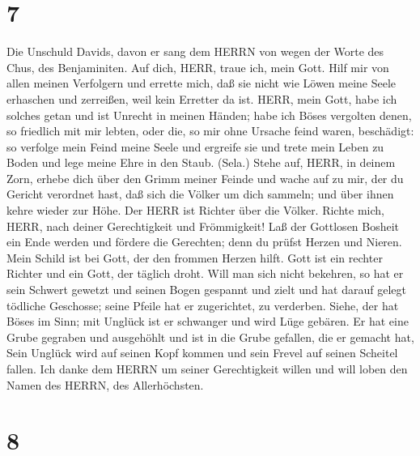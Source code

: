 \hypertarget{section-6}{%
\section{7}\label{section-6}}

 Die Unschuld Davids, davon er sang dem HERRN von wegen der
Worte des Chus, des Benjaminiten. Auf dich, HERR, traue ich, mein Gott.
Hilf mir von allen meinen Verfolgern und errette mich,  daß
sie nicht wie Löwen meine Seele erhaschen und zerreißen, weil kein
Erretter da ist.  HERR, mein Gott, habe ich solches getan
und ist Unrecht in meinen Händen;  habe ich Böses vergolten
denen, so friedlich mit mir lebten, oder die, so mir ohne Ursache feind
waren, beschädigt:  so verfolge mein Feind meine Seele und
ergreife sie und trete mein Leben zu Boden und lege meine Ehre in den
Staub. (Sela.)  Stehe auf, HERR, in deinem Zorn, erhebe dich
über den Grimm meiner Feinde und wache auf zu mir, der du Gericht
verordnet hast,  daß sich die Völker um dich sammeln; und
über ihnen kehre wieder zur Höhe.  Der HERR ist Richter über
die Völker. Richte mich, HERR, nach deiner Gerechtigkeit und
Frömmigkeit!  Laß der Gottlosen Bosheit ein Ende werden und
fördere die Gerechten; denn du prüfst Herzen und Nieren. 
Mein Schild ist bei Gott, der den frommen Herzen hilft. 
Gott ist ein rechter Richter und ein Gott, der täglich droht.
 Will man sich nicht bekehren, so hat er sein Schwert
gewetzt und seinen Bogen gespannt und zielt  und hat darauf
gelegt tödliche Geschosse; seine Pfeile hat er zugerichtet, zu
verderben.  Siehe, der hat Böses im Sinn; mit Unglück ist
er schwanger und wird Lüge gebären.  Er hat eine Grube
gegraben und ausgehöhlt und ist in die Grube gefallen, die er gemacht
hat,  Sein Unglück wird auf seinen Kopf kommen und sein
Frevel auf seinen Scheitel fallen.  Ich danke dem HERRN um
seiner Gerechtigkeit willen und will loben den Namen des HERRN, des
Allerhöchsten.

\hypertarget{section-7}{%
\section{8}\label{section-7}}

